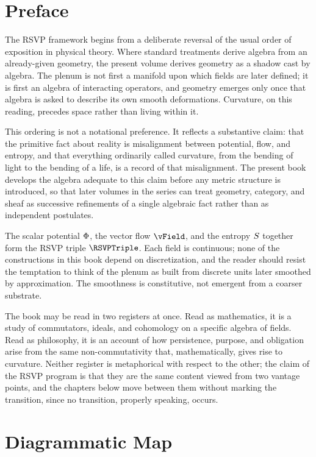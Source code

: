 \chapter*{Preface}

The RSVP framework begins from a deliberate reversal of the usual order of exposition in physical theory. Where standard treatments derive algebra from an already-given geometry, the present volume derives geometry as a shadow cast by algebra. The plenum is not first a manifold upon which fields are later defined; it is first an algebra of interacting operators, and geometry emerges only once that algebra is asked to describe its own smooth deformations. Curvature, on this reading, precedes space rather than living within it.

This ordering is not a notational preference. It reflects a substantive claim: that the primitive fact about reality is misalignment between potential, flow, and entropy, and that everything ordinarily called curvature, from the bending of light to the bending of a life, is a record of that misalignment. The present book develops the algebra adequate to this claim before any metric structure is introduced, so that later volumes in the series can treat geometry, category, and sheaf as successive refinements of a single algebraic fact rather than as independent postulates.

The scalar potential $\Phi$, the vector flow $\vField$, and the entropy $S$ together form the RSVP triple $\RSVPTriple$. Each field is continuous; none of the constructions in this book depend on discretization, and the reader should resist the temptation to think of the plenum as built from discrete units later smoothed by approximation. The smoothness is constitutive, not emergent from a coarser substrate.

The book may be read in two registers at once. Read as mathematics, it is a study of commutators, ideals, and cohomology on a specific algebra of fields. Read as philosophy, it is an account of how persistence, purpose, and obligation arise from the same non-commutativity that, mathematically, gives rise to curvature. Neither register is metaphorical with respect to the other; the claim of the RSVP program is that they are the same content viewed from two vantage points, and the chapters below move between them without marking the transition, since no transition, properly speaking, occurs.

\chapter*{Diagrammatic Map}

